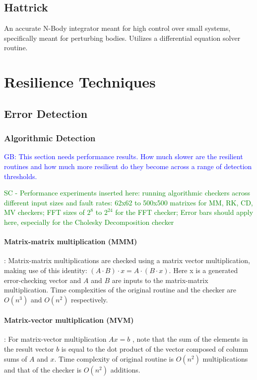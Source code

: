 \documentclass[prodmode,acmtecs]{acmconf} %
\newcommand{\sui}[1]{%
  \textcolor{green}{SC - #1}
}
\newcommand{\greg}[1]{%
  \textcolor{blue}{GB: #1}
}
\begin{document}
\subsection{Hattrick}
\label{sec:apps:hattrick}
An accurate N-Body integrator meant for high control over small systems, specifically meant for perturbing bodies. Utilizes a differential equation solver routine.

\section{Resilience Techniques}
\label{sec:res_tech}

\subsection{Error Detection}
\label{sec:res_tech:err_det}

\subsubsection{Algorithmic Detection}
\label{sec:res_tech:err_det:algo}

\greg{This section needs performance results. How much slower are the resilient routines and how much more resilient do they become across a range of detection thresholds.}
\sui{Performance experiments inserted here: running algorithmic checkers across different input sizes and fault rates: 62x62 to 500x500 matrixes for MM, RK, CD, MV checkers; FFT sizes of $2^8$ to $2^{24}$ for the FFT checker; Error bars should apply here, especially for the Cholesky Decomposition checker}

\paragraph{Matrix-matrix multiplication (MMM)}:
Matrix-matrix multiplications are checked using a matrix vector multiplication, making use of this identity: $(A \cdot B) \cdot x = A \cdot (B \cdot x)$. Here x is a generated error-checking vector and $A$ and $B$ are inputs to the matrix-matrix multiplication. Time complexities of the original routine and the checker are $O(n^3)$ and $O(n^2)$ respectively.


\paragraph{Matrix-vector multiplication (MVM)}:
For matrix-vector multiplication $Ax=b$ , note that the sum of the elements in the result vector $b$ is equal to the dot product of the vector composed of column sums of $A$ and $x$. Time complexity of original routine is $O(n^2)$ multiplications and that of the checker is $O(n^2)$ additions.
\end{document}

